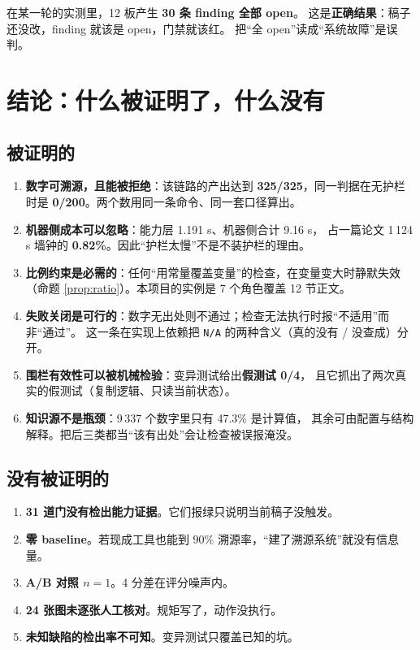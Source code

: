 \documentclass[11pt,a4paper]{article}
\newcommand{\code}[1]{\texttt{#1}}
\begin{document}
在某一轮的实测里，12 板产生 \textbf{30 条 finding 全部 open}。
这是\textbf{正确结果}：稿子还没改，finding 就该是 open，门禁就该红。
把“全 open”读成“系统故障”是误判。

\section{结论：什么被证明了，什么没有}

\subsection{被证明的}
\begin{enumerate}[leftmargin=1.6em,itemsep=2pt]
\item \textbf{数字可溯源，且能被拒绝}：该链路的产出达到 \textbf{325/325}，同一判据在无护栏时是 \textbf{0/200}。两个数用同一条命令、同一套口径算出。
\item \textbf{机器侧成本可以忽略}：能力层 1.191 s、机器侧合计 9.16 s，
  占一篇论文 1\,124 s 墙钟的 \textbf{0.82\%}。因此“护栏太慢”不是不装护栏的理由。
\item \textbf{比例约束是必需的}：任何“用常量覆盖变量”的检查，在变量变大时静默失效
  （命题 \ref{prop:ratio}）。本项目的实例是 7 个角色覆盖 12 节正文。
\item \textbf{失败关闭是可行的}：数字无出处则不通过；检查无法执行时报“不适用”而非“通过”。
  这一条在实现上依赖把 \code{N/A} 的两种含义（真的没有 / 没查成）分开。
\item \textbf{围栏有效性可以被机械检验}：变异测试给出\textbf{假测试 0/4}，
  且它抓出了两次真实的假测试（复制逻辑、只读当前状态）。
\item \textbf{知识源不是瓶颈}：9\,337 个数字里只有 47.3\% 是计算值，
  其余可由配置与结构解释。把后三类都当“该有出处”会让检查被误报淹没。
\end{enumerate}

\subsection{没有被证明的}
\begin{enumerate}[leftmargin=1.6em,itemsep=2pt]
\item \textbf{31 道门没有检出能力证据}。它们报绿只说明当前稿子没触发。
\item \textbf{零 baseline}。若现成工具也能到 90\% 溯源率，“建了溯源系统”就没有信息量。
\item \textbf{A/B 对照 $n=1$}。4 分差在评分噪声内。
\item \textbf{24 张图未逐张人工核对}。规矩写了，动作没执行。
\item \textbf{未知缺陷的检出率不可知}。变异测试只覆盖已知的坑。
\end{enumerate}
\end{document}
